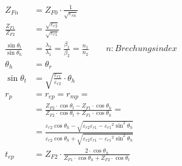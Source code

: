 \begin{align*}
    Z_{Fn}                            & = Z_{F0}\cdot\frac{1}{\sqrt{\varepsilon_{rn}}}                                                                                                                                                                              \\
    \frac{Z_{F1}}{Z_{F2}}             & = \frac{\sqrt{\varepsilon_{r2}}}{\sqrt{\varepsilon_{r1}}}                                                                                                                                                                   \\
    \frac{\sin\theta_t}{\sin\theta_h} & = \frac{\lambda_2}{\lambda_1}= \frac{\beta_1}{\beta_2}= \frac{n_1}{n_2} \qquad n: Brechungsindex                                                                                                                            \\
    \theta_h                          & = \theta_r                                                                                                                                                                                                                  \\
    \sin\theta_t                      & = \sqrt{\frac{\varepsilon_{r1}}{\varepsilon_{r2}}}\cdot\theta_h                                                                                                                                                             \\
    r_p                               & =  r_{e p} = r_{m p} =                                                                                                                                                                                                      \\
                                      & = \frac{Z_{F 2} \cdot \cos \theta_t-Z_{F 1} \cdot \cos \theta_h}{Z_{F 2} \cdot \cos \theta_t+Z_{F 1} \cdot \cos \theta_h} =                                                                                                 \\
                                      & = \frac{\varepsilon_{r2}\cos\theta_h-\sqrt{\varepsilon_{r2}\varepsilon_{r1}-{\varepsilon_{r1}}^2\sin^2\theta_h}}{\varepsilon_{r2}\cos\theta_h+\sqrt{{\varepsilon_{r2}\varepsilon_{r1}-{\varepsilon_{r1}}^2\sin^2\theta_h}}} \\
    t_{e p}                           & = Z_{F 2} \cdot \frac{2 \cdot \cos \theta_h}{Z_{F 1} \cdot \cos \theta_h+Z_{F 2} \cdot \cos \theta_t}                                                                                                                       \\

\end{align*}
